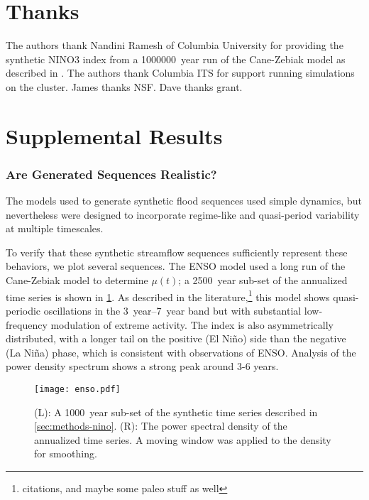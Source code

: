 \documentclass[12pt]{article}
\begin{document}

\appendix

\section{Thanks}

The authors thank Nandini Ramesh of Columbia University for providing the synthetic NINO3 index from a \SI{1000000}{year} run of the Cane-Zebiak model as described in \citet{Ramesh2017}.
The authors thank Columbia ITS for support running simulations on the cluster.
James thanks NSF.
Dave thanks grant.

\section{Supplemental Results}

\subsubsection{Are Generated Sequences Realistic?\label{sec:sequence-realistic}}

The models used to generate synthetic flood sequences used simple dynamics, but nevertheless were designed to incorporate regime-like and quasi-period variability at multiple timescales.

To verify that these synthetic streamflow sequences sufficiently represent these behaviors, we plot several sequences.
The ENSO model used a long run of the Cane-Zebiak model \citep{Zebiak1987,Ramesh2017} to determine \(\mu(t)\); a \SI{2500}{year} sub-set of the annualized time series is shown in \cref{fig:enso-ts}.
As described in the literature,\footnote{citations, and maybe some paleo stuff as well} this model shows quasi-periodic oscillations in the \SIrange{3}{7}{year} band but with substantial low-frequency modulation of extreme activity.
The index is also asymmetrically distributed, with a longer tail on the positive (El Ni\~{n}o) side than the negative (La Ni\~{n}a) phase, which is consistent with observations of ENSO.
Analysis of the power density spectrum shows a strong peak around 3-6 years.
\begin{figure}
  \texttt{[image: enso.pdf]}
  \caption{
    (L): A \SI{1000}{year} sub-set of the synthetic time series described in \cref{sec:methods-nino}.
    (R): The power spectral density of the annualized time series. A moving window was applied to the density for smoothing.\label{fig:enso-ts}
  }
\end{figure}
\end{document}
